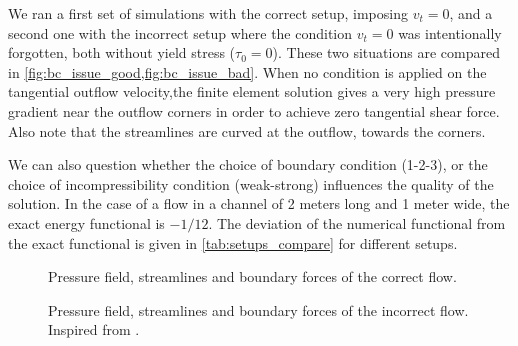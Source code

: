 \documentclass[11 pt]{report}
\begin{document}
We ran a first set of simulations with the correct setup, imposing $v_t=0$, and a second one with the incorrect setup where the condition $v_t=0$ was intentionally forgotten, both without yield stress ($\tau_0=0$). These two situations are compared in \cref{fig:bc_issue_good,fig:bc_issue_bad}. When no condition is applied on the tangential outflow velocity,the finite element solution gives a very high pressure gradient near the outflow corners in order to achieve zero tangential shear force. Also note that the streamlines are curved at the outflow, towards the corners.

We can also question whether the choice of boundary condition (1-2-3), or the choice of incompressibility condition (weak-strong) influences the quality of the solution. In the case of a flow in a channel of 2 meters long and 1 meter wide, the exact energy functional is $-1/12$. The deviation of the numerical functional from the exact functional is given in \cref{tab:setups_compare} for different setups.

\vspace{-24pt}
%         
%         
\begin{figure}[H]
    \centering
    
    \caption{Pressure field, streamlines and boundary forces of the correct flow.}
    \label{fig:bc_issue_good}
\end{figure}
\begin{figure}[H]
    \centering
    
    \caption{Pressure field, streamlines and boundary forces of the incorrect flow. Inspired from \cite{stokesBC}.}
    \label{fig:bc_issue_bad}
\end{figure}
\end{document}
